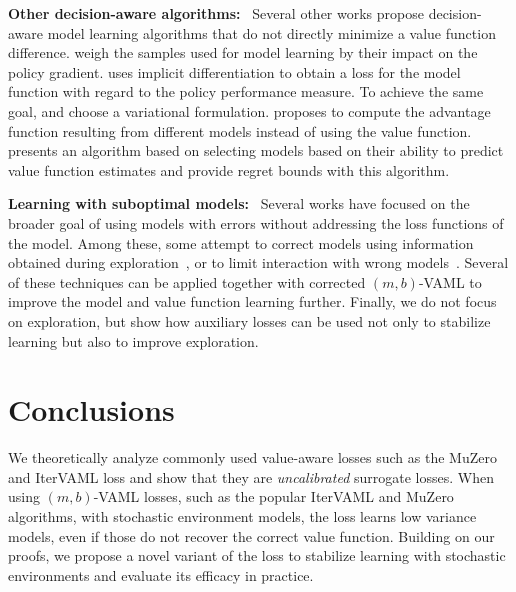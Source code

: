 \textbf{Other decision-aware algorithms:}~ Several other works propose decision-aware model learning algorithms that do not directly minimize a value function difference.
\textcite{doro2020gradient} weigh the samples used for model learning by their impact on the policy gradient.
\textcite{nikishin2021control} uses implicit differentiation to obtain a loss for the model function with regard to the policy performance measure. 
To achieve the same goal, \textcite{eysenbach2022mismatched} and \textcite{ghugare2023simplifying} choose a variational formulation.
\textcite{Modhe2021ModelAdvantageOF} proposes to compute the advantage function resulting from different models instead of using the value function.
\textcite{ayoub2020model} presents an algorithm based on selecting models based on their ability to predict value function estimates and provide regret bounds with this algorithm.

\textbf{Learning with suboptimal models:}~ Several works have focused on the broader goal of using models with errors without addressing the loss functions of the model.
Among these, some attempt to correct models using information obtained during exploration~\parencite{joseph2013reinforcement,talvitie2017self,modi2020sample,rakhsha2022operator,rakhsha2024maximum}, or to limit interaction with wrong models~\parencite{buckman2018sample,mbpo,pmlr-v119-abbas20a}.
Several of these techniques can be applied together with corrected $(m,b)$-VAML to improve the model and value function learning further.
Finally, we do not focus on exploration, but \textcite{guo2022byolexplore} show how auxiliary losses can be used not only to stabilize learning but also to improve exploration.

\section{Conclusions}


We theoretically analyze commonly used value-aware losses such as the MuZero and IterVAML loss and show that they are \emph{uncalibrated} surrogate losses.
When using $(m,b)$-VAML losses, such as the popular IterVAML and MuZero algorithms, with stochastic environment models, the loss learns low variance models, even if those do not recover the correct value function.
Building on our proofs, we propose a novel variant of the loss to stabilize learning with stochastic environments and evaluate its efficacy in practice.

